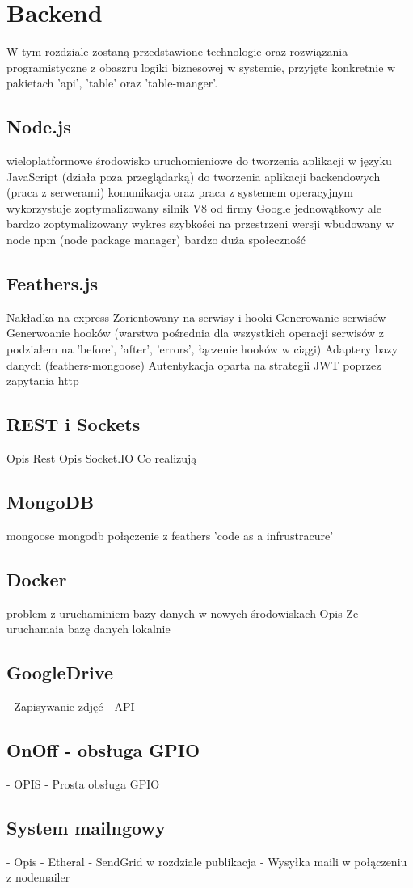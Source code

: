 \chapter{Backend}
\label{ch:funplenop}
W tym rozdziale zostaną przedstawione technologie oraz rozwiązania programistyczne z obaszru logiki biznesowej w systemie, przyjęte konkretnie w pakietach 'api', 'table' oraz 'table-manger'.

\section{Node.js}

wieloplatformowe środowisko uruchomieniowe do tworzenia aplikacji w języku JavaScript (działa poza przeglądarką) do tworzenia aplikacji backendowych (praca z serwerami)
komunikacja oraz praca z systemem operacyjnym
wykorzystuje zoptymalizowany silnik V8 od firmy Google
jednowątkowy ale bardzo zoptymalizowany
wykres szybkości na przestrzeni wersji
wbudowany w node npm (node package manager)
bardzo duża społeczność


\section{Feathers.js}
Nakładka na express
Zorientowany na serwisy i hooki
Generowanie serwisów
Generwoanie hooków (warstwa pośrednia dla wszystkich operacji serwisów z podziałem na 'before', 'after', 'errors', łączenie hooków w ciągi)
Adaptery bazy danych (feathers-mongoose)
Autentykacja oparta na strategii JWT poprzez zapytania http


\section{REST i Sockets}
Opis Rest
Opis Socket.IO
Co realizują

\section{MongoDB}
mongoose
mongodb
połączenie z feathers
'code as a infrustracure'

\section{Docker}
problem z uruchaminiem bazy danych w nowych środowiskach
Opis
Ze uruchamaia bazę danych lokalnie

\section{GoogleDrive}
- Zapisywanie zdjęć
- API

\section{OnOff - obsługa GPIO}
- OPIS
- Prosta obsługa GPIO

\section{System mailngowy}
- Opis
- Etheral
- SendGrid w rozdziale publikacja
- Wysyłka maili w połączeniu z nodemailer